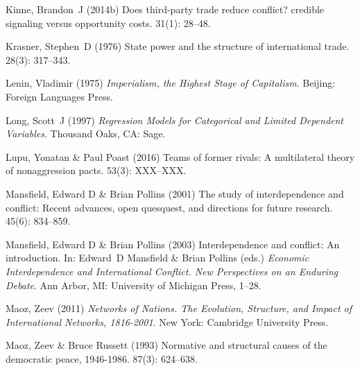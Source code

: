 \documentclass[12pt]{article}
\theoremstyle{hypothesis}
\begin{document}
\begin{thebibliography}{}
Kinne, Brandon~J (2014b) Does third-party trade reduce conflict? credible
  signaling versus opportunity costs.
 { 31\/}(1): 28--48.

Krasner, Stephen~D (1976) State power and the structure of international trade.
 { 28\/}(3): 317--343.

Lenin, Vladimir (1975) {\em Imperialism, the Highest Stage of Capitalism}.
\newblock Beijing: Foreign Languages Press.

Long, Scott~J (1997) {\em Regression Models for Categorical and Limited
  Dependent Variables}.
\newblock Thousand Oaks, CA: Sage.

Lupu, Yonatan \& Paul Poast (2016) Teams of former rivals: A multilateral theory of nonaggression pacts.
 { 53\/}(3): XXX--XXX.

Mansfield, Edward D  \& Brian Pollins (2001) The study of interdependence and
  conflict: Recent advances, open quesquest, and directions for future
  research.
 { 45\/}(6): 834--859.

Mansfield, Edward D  \& Brian Pollins (2003) Interdependence and conflict: An
  introduction.
\newblock In: Edward~D Mansfield \& Brian Pollins (eds.) {\em Economic
  Interdependence and International Conflict. New Perspectives on an Enduring
  Debate}. Ann Arbor, MI: University of Michigan Press,  1--28.

Maoz, Zeev (2011) {\em Networks of Nations. The Evolution, Structure, and
  Impact of International Networks, 1816-2001}.
\newblock New York: Cambridge University Press.

Maoz, Zeev  \& Bruce Russett (1993) Normative and structural causes of the
  democratic peace, 1946-1986.
 { 87\/}(3): 624--638.


\end{thebibliography}
\end{document}
